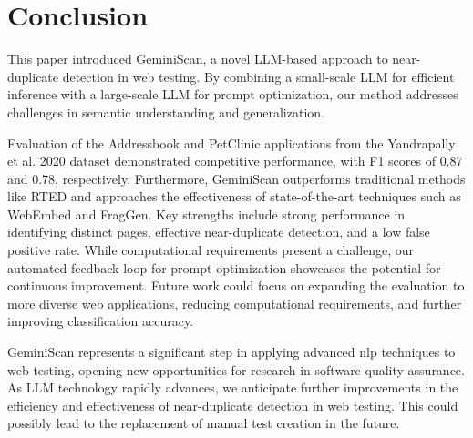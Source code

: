 \section{Conclusion}
    \label{sec:conclusion}
    
    This paper introduced GeminiScan, a novel LLM-based approach to near-duplicate detection in web testing. By combining a small-scale LLM for efficient inference with a large-scale LLM for prompt optimization, our method addresses challenges in semantic understanding and generalization.
    
    Evaluation of the Addressbook and PetClinic applications from the Yandrapally et al. 2020 dataset demonstrated competitive performance, with F1 scores of 0.87 and 0.78, respectively. Furthermore, GeminiScan outperforms traditional methods like RTED and approaches the effectiveness of state-of-the-art techniques such as WebEmbed and FragGen. Key strengths include strong performance in identifying distinct pages, effective near-duplicate detection, and a low false positive rate. While computational requirements present a challenge, our automated feedback loop for prompt optimization showcases the potential for continuous improvement. Future work could focus on expanding the evaluation to more diverse web applications, reducing computational requirements, and further improving classification accuracy.
    
    GeminiScan represents a significant step in applying advanced \ac{nlp} techniques to web testing, opening new opportunities for research in software quality assurance. As LLM technology rapidly advances, we anticipate further improvements in the efficiency and effectiveness of near-duplicate detection in web testing. This could possibly lead to the replacement of manual test creation in the future.